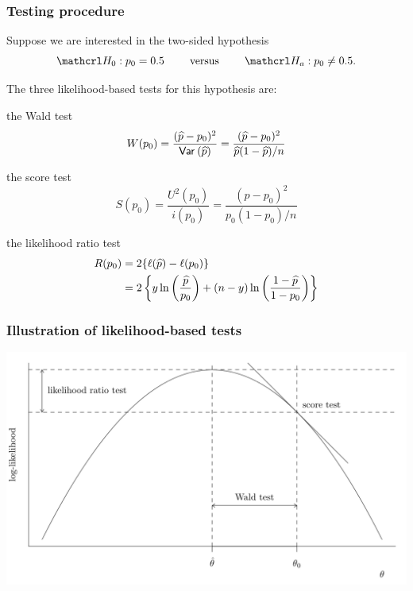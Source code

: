 \documentclass{beamer}
\begin{document}
\begin{frame}
 \frametitle{Testing procedure}
 Suppose we are interested in the two-sided hypothesis 
 \[\Hy_0: p_0 = 0.5 \qquad \text{ versus } \qquad \Hy_a: p_0 \neq 0.5.\]
 
 The three likelihood-based tests for this hypothesis are:
 \bi \item 
 the Wald test 
  \[W(p_0) = \frac{(\widehat{p} - p_0)^2}{{\mathsf{Var}_{}}\left(\widehat{p}\right)} = \frac{(\widehat{p}-p_0)^2}{\widehat{p}(1-\widehat{p})/n}\]
  \item  the score test 
  \[S(p_0) = \frac{U^2(p_0)}{i(p_0)} = \frac{(\widehat{p}-p_0)^2}{p_0(1-p_0)/n}\]
 \item the likelihood ratio test
 \begin{align*}
  R(p_0) &= 2\{\ell(\widehat{p}) - \ell(p_0)\} 
  \\&= 2 \left\{ y\ln \left(\frac{\widehat{p}}{p_0}\right) + (n-y)\ln\left(\frac{1-\widehat{p}}{1-p_0}\right)\right\}
 \end{align*}
\ei
 \end{frame}
  \begin{frame}
 \frametitle{Illustration of likelihood-based tests}
 \begin{center}
  \includegraphics[width = \linewidth]{img/c3/likelihood_tests}
 \end{center}
\end{frame}
\end{document}
